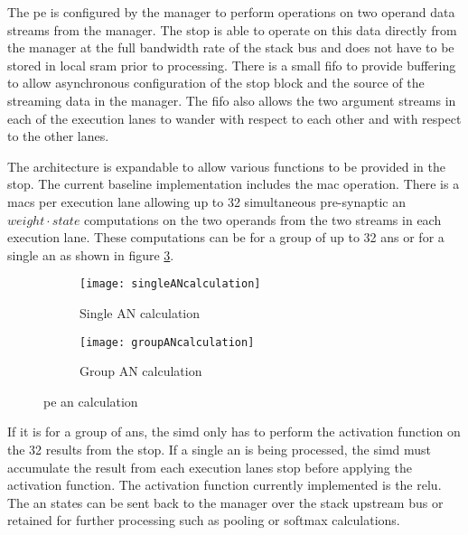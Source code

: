 The \ac{pe} is configured by the manager to perform operations on two operand data streams from the manager. 
The \ac{stop} is able to operate on this data directly from the manager at the full bandwidth rate of the stack bus and does not have to be stored in local \ac{sram} prior to processing. 
There is a small \ac{fifo} to provide buffering to allow asynchronous configuration of the \ac{stop} block and the source of the streaming data in the manager. 
The \ac{fifo} also allows the two argument streams in each of the execution lanes to wander with respect to each other and with respect to the other lanes.

The architecture is expandable to allow various functions to be provided in the \ac{stop}.
The current baseline implementation includes the \ac{mac} operation.
There is a \acp{mac} per execution lane allowing up to 32 simultaneous pre-synaptic \ac{an} $weight \cdot state$ computations on the two operands from the two streams in each execution lane.
These computations can be for a group of up to 32 \acp{an} or for a single \ac{an} as shown in figure \ref{fig:PE AN calculation}.

\begin{figure}
\centering
  \begin{subfigure}{.49\textwidth}
    \centering
    \texttt{[image: singleANcalculation]}
    \captionsetup{justification=centering, skip=10pt}
    \caption{Single AN calculation}
    \label{fig:Single AN calculation}
  \end{subfigure}%
  \begin{subfigure}{.49\textwidth}
    \centering
    \vspace{40pt}
    \texttt{[image: groupANcalculation]}
    \captionsetup{justification=centering, skip=10pt}
    \caption{Group AN calculation}
    \label{fig:Group AN calculation}
  \end{subfigure}%
\vspace{-10pt}
\captionsetup{justification=centering, skip=16pt}
\caption{\ac{pe} \ac{an} calculation}
\label{fig:PE AN calculation}
\end{figure}

If it is for a group of \acp{an}, the \ac{simd} only has to perform the activation function on the 32 results from the \ac{stop}. 
If a single \ac{an} is being processed, the \ac{simd} must accumulate the result from each execution lanes \ac{stop} before applying the activation function.
The activation function currently implemented is the \ac{relu}.
The \ac{an} states can be sent back to the manager over the stack upstream bus or retained for further processing such as pooling or softmax calculations.

